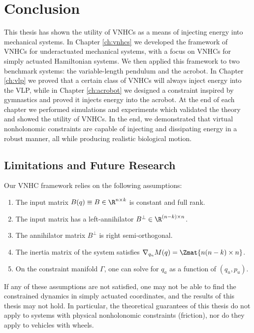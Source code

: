 

\chapter{Conclusion}\label{ch:conclusion}

This thesis has shown the utility of VNHCs as a means of injecting energy into
mechanical systems.
In Chapter \ref{ch:vnhcs} we developed the framework of VNHCs for underactuated
mechanical systems, with a focus on VNHCs for simply actuated Hamiltonian
systems.
We then applied this framework to two benchmark systems: the variable-length
pendulum and the acrobot.
In Chapter \ref{ch:vlp} we proved that a certain class of VNHCs will always
inject energy into the VLP, while in Chapter \ref{ch:acrobot} we designed a
constraint inspired by gymnastics and proved it injects energy into the
acrobot.
At the end of each chapter we performed simulations and experiments which
validated the theory and showed the utility of VNHCs. 
In the end, we demonstrated that virtual nonholonomic constraints are capable of
injecting and dissipating energy in a robust manner, all while producing
realistic biological motion.

\section{Limitations and Future Research}
Our VNHC framework relies on the following assumptions:
\begin{enumerate}
    \item The input matrix \(B(q) \equiv B \in \R^{n \times k}\) is constant and
        full rank.
    \item The input matrix has a left-annihilator 
        \(B^\perp \in \R^{(n-k)\times n}\). 
    \item The annihilator matrix \(B^\perp\) is right semi-orthogonal.
    \item The inertia matrix of the system satisfies 
        \(\nabla_{q_u}M(q) = \Zmat{n(n-k) \times n}\).
    \item On the constraint manifold \(\Gamma\), one can solve for \(q_a\) as a
        function of \((q_u,p_u)\).
\end{enumerate}
If any of these assumptions are not satisfied, one may not be able to find the
constrained dynamics in simply actuated coordinates, and the results of this
thesis may not hold.
In particular, the theoretical guarantees of this thesis do not apply to systems
with physical nonholonomic constraints (\eg friction), nor do they apply to vehicles
with wheels.

